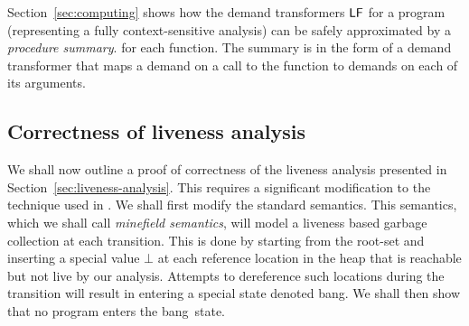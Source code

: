 \documentclass[9pt]{sigplanconf}
\newcommand{\bang}{\mbox{\sc bang}}
\begin{document}
Section~\ref{sec:computing}   shows   how   the  demand   transformers
$\mathsf{LF}$  for  a  program  (representing  a  fully  context-sensitive
analysis) can be safely approximated by a {\em procedure summary}. for
each function.   The summary  is in the  form of a  demand transformer
that maps a demand on a call to the function to demands on each of its
arguments.

\subsection{Correctness of liveness analysis}  
 
We shall now  outline a proof of correctness  of the liveness analysis
presented  in  Section~\ref{sec:liveness-analysis}.   This requires  a
significant modification  to the technique  used in \cite{asati14lgc}.
We shall first modify the standard semantics. This semantics, which we
shall  call {\em  minefield semantics},  will model  a  liveness based
garbage collection at  each transition. This is done  by starting from
the root-set  and inserting a  special value $\bot$ at  each reference
location in the  heap that is reachable but not  live by our analysis.
Attempts  to dereference  such  locations during  the transition  will
result in entering a special  state denoted \bang.  We shall then show
that no program enters the \bang\ state.
 
\end{document}
